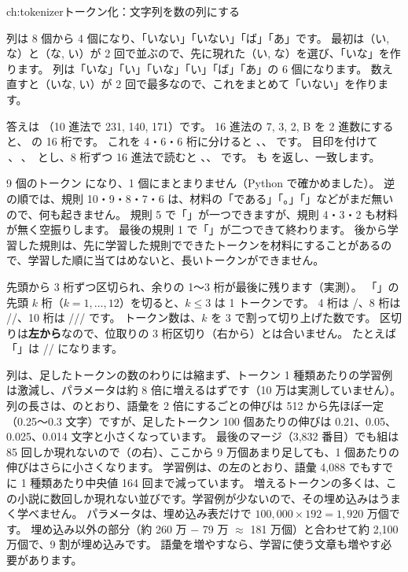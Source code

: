 \begin{answers}{ch:tokenizer}{トークン化：文字列を数の列にする}
\item 列は 8 個から 4 個になり、「いない」「いない」「ば」「あ」です。
最初は（い, な）と（な, い）が 2 回で並ぶので、先に現れた（い, な）を選び、「いな」を作ります。
列は「いな」「い」「いな」「い」「ば」「あ」の 6 個になります。
数え直すと（いな, い）が 2 回で最多なので、これをまとめて「いない」を作ります。
\item 答えは （10 進法で 231, 140, 171）です。
16 進法の 7, 3, 2, B を 2 進数にすると、 の 16 桁です。
これを 4・6・6 桁に分けると 、、 です。
目印を付けて \,、\,、\, とし、8 桁ずつ 16 進法で読むと 、、 です。
 も \code{[231, 140, 171]} を返し、一致します。
\item 9 個のトークン  になり、1 個にまとまりません（Python で確かめました）。
逆の順では、規則 10・9・8・7・6 は、材料の「である」「。」「」などがまだ無いので、何も起きません。
規則 5 で「」が一つできますが、規則 4・3・2 も材料が無く空振りします。
最後の規則 1 で「」が二つできて終わります。
後から学習した規則は、先に学習した規則でできたトークンを材料にすることがあるので、学習した順に当てはめないと、長いトークンができません。
\item 先頭から 3 桁ずつ区切られ、余りの 1〜3 桁が最後に残ります（実測）。
「」の先頭 $k$ 桁（$k=1,\dots,12$）を切ると、$k\le3$ は 1 トークンです。
4 桁は /、8 桁は //、10 桁は /// です。
トークン数は、$k$ を 3 で割って切り上げた数です。
区切りは\textbf{左から}なので、位取りの 3 桁区切り（右から）とは合いません。
たとえば「」は // になります。
\item 列は、足したトークンの数のわりには縮まず、トークン 1 種類あたりの学習例は激減し、パラメータは約 8 倍に増えるはずです（10 万は実測していません）。
列の長さは、のとおり、語彙を 2 倍にするごとの伸びは 512 から先ほぼ一定（0.25〜0.3 文字）ですが、足したトークン 100 個あたりの伸びは 0.21、0.05、0.025、0.014 文字と小さくなっています。
最後のマージ（3,832 番目）でも組は 85 回しか現れないので（の右）、ここから 9 万個あまり足しても、1 個あたりの伸びはさらに小さくなります。
学習例は、の左のとおり、語彙 4,088 でもすでに 1 種類あたり中央値 164 回まで減っています。
増えるトークンの多くは、この小説に数回しか現れない並びです。学習例が少ないので、その埋め込みはうまく学べません。
パラメータは、埋め込み表だけで $100{,}000\times192=1{,}920$ 万個です。
埋め込み以外の部分（約 260 万 $-$ 79 万 $\approx$ 181 万個）と合わせて約 2,100 万個で、9 割が埋め込みです。
語彙を増やすなら、学習に使う文章も増やす必要があります。
\end{answers}

